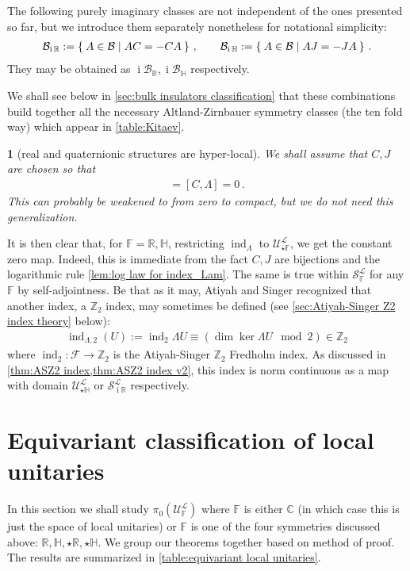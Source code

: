 \documentclass[a4paper,10pt]{article}
\numberwithin{equation}{section}
\theoremstyle{plain}
\theoremstyle{plain}
\theoremstyle{plain}
\theoremstyle{plain}
\theoremstyle{plain}
\newtheorem{assumption}[thm]{\protect\assumptionname}
\theoremstyle{remark}
\theoremstyle{definition}
\theoremstyle{plain}
\providecommand{\assumptionname}{Assumption}
\newcommand{\ii}{\operatorname{i}}
\newcommand{\ZZ}{\mathbb{Z}}
\newcommand{\RR}{\mathbb{R}}
\newcommand{\CC}{\mathbb{C}}
\newcommand{\FF}{\mathbb{F}}
\newcommand{\calB}{\mathcal{B}}
\newcommand{\calF}{\mathcal{F}}
\newcommand{\calU}{\mathcal{U}}
\newcommand{\calSU}{\mathcal{S}}
\newcommand{\calL}{\mathcal{L}}
\newcommand{\bbLambda}{\mathbb{\Lambda}}
\newcommand{\HH}{\mathbb{H}}
\newcommand{\findex}{\operatorname{ind}}
\newcommand{\eql}[1]{\begin{align}#1\end{align}}
\begin{document}
	The following purely imaginary classes are not independent of the ones presented so far, but we introduce them separately nonetheless for notational simplicity: \eql{\label{eq:pure imaginary real or quaternionic operators} \calB_{\ii\RR} := \Set{A\in\calB | AC=-CA} \,,\qquad \calB_{\ii\HH} := \Set{A\in\calB | AJ=-JA}\,. } They may be obtained as $\ii \calB_\RR,\ii\calB_\HH$ respectively.
	
	We shall see below in \cref{sec:bulk insulators classification} that these combinations build together all the necessary Altland-Zirnbauer symmetry classes (the ten fold way) which appear in \cref{table:Kitaev}.
	
	\begin{assumption}[real and quaternionic structures are hyper-local]\label{ass:real and quaternionic structures are hyperlocal}
		We shall assume that $C,J$ are chosen so that \eql{[J,\Lambda]=[C,\Lambda]=0\,.}
		This can probably be weakened to from zero to compact, but we do not need this generalization.
	\end{assumption}
	
	
	It is then clear that, for $\FF=\RR,\HH$, restricting $\findex_\Lambda$ to $\calU_{\star\FF}^\calL$, we get the constant zero map. Indeed, this is immediate from the fact $C,J$ are bijections and the logarithmic rule \cref{lem:log law for index_Lam}. The same is true within $\calSU^{\calL}_{\FF}$ for any $\FF$ by self-adjointness. Be that as it may, Atiyah and Singer recognized that another index, a $\ZZ_2$ index, may sometimes be defined (see \cref{sec:Atiyah-Singer Z2 index theory} below): \eql{\findex_{\Lambda,2}(U) := \findex_{2}\bbLambda U \equiv \left(\dim \ker \bbLambda U \mod 2\right) \in \ZZ_2} where $\findex_{2}:\calF\to\ZZ_2$ is the Atiyah-Singer $\ZZ_2$ Fredholm index. As discussed in \cref{thm:ASZ2 index,thm:ASZ2 index v2}, this index is norm continuous as a map with domain $\calU_{\star\HH}^\calL$ or $\calSU^{\calL}_{\ii\RR}$ respectively.
	
	\section{Equivariant classification of local unitaries}\label{sec:local unitaries classification}
	In this section we shall study $\pi_0(\calU_\FF^\calL)$ where $\FF$ is either $\CC$ (in which case this is just the space of local unitaries) or $\FF$ is one of the four symmetries discussed above: $\RR,\HH,\star\RR,\star\HH$. We group our theorems together based on method of proof. The results are summarized in \cref{table:equivariant local unitaries}.
	
\end{document}
